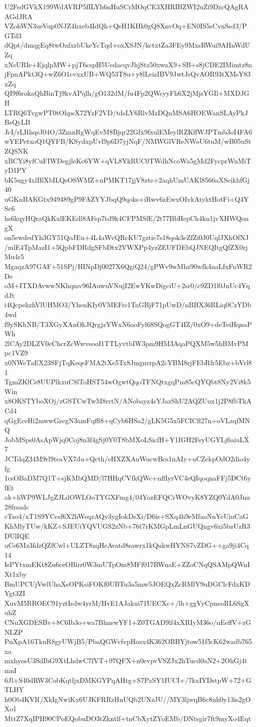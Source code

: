 U2FsdGVkX199WdAVRP5fILYh6nHuSCrMOqCE3XHRIBZWI2uZi9DzcQAgRAAGdJRA
VZohWN3ueVup0NJZ4hxeb4IdQh+QeH1KHk0gQ8XnvOq+EN0IS5sCvnSsd3/PGTd3
dQpt/dmqgEq8twOafxrbUkeYcTqd+oxXSJN/kctxtZa3FEy9MxsRWui9AHnWdUZq
xNsURIe+EjqlpMW+pjT6cspH5UedacqvJhjStz50xwaX9+SB+s8jCDE2IMimtz8n
jFpnAPkt3Q+wZ6O1cvxxUB+WQ53T8u+y8lLeizIBV9JwtJsQvAOR93tXMsY83xZq
QI9f6rokaQhBinTj9kvAPqlh/gO132dM/fu4Fp2QWsyyFh6X2jMjsYGIl+MXDJGH
LTRQ6TvgwPT0tOhpsX72YzF2VD/tdsLY6RlvMzDQnMSA6HOEWanSLAyPkJBsQyLB
JcI/rLRhqsJ04O/3ZmnRgWqEvM8Bjqr22Gfx9fxulEMeylRZKffWJPTmb3oI4FA6
wYEPetxoQ1QYFB/KSydxpUvl9p6D7yjNqF/NMWGlVReNWoU6tuM/wB05uStZQSNK
xBCYi8yfCuFIWDegjleKc6YW+qVL8YkRUC0TWdhNcoWa5gMd2FycprWuMiTyD1PY
bK5ugy4xlBlXbILQsOSWMZ+nPMKT17jjV8zte+2aqhUmUAKl8566aXSeikhfGj40
uGKnBAKGtx949489gP9FAZYYJbqQ9qoks+iRwv6zEwxOIvkAtyktHotFi+Q4YSc6
hs6kqyHQraQkKxlEKEdl8AFsp7td9k4CFPMSfE/2t77BbHepCh4kn1jvXHWQongX
on5ewdedYh3GY51QoJEu+4L4aWvQRcKU7gztie7s18qok3eZfZi0J0UqlJXhOfNJ
/mlE4TpMazI1+5QpbFDRdgSFbDtx2VWXPp4yzZEUFDEbQJNEQItgQfZX0rjMu4r5
MgaqzA97GAF+51SPj/HINpDj0027X6QgiQ24/gPWv9wMhz90wfk4naLfxFuWR2De
oM+ITXDAvwwNKhqmv96IAuwnVNujI2EwYKwDigciU+2sr0/c9ZD1l0JnUc4YqdJt
i4QcpekzhVlUHMO3/YhenKIy0VMEFrs1TaGBjF71pUwD/nBBX36RLiq0CzYDb4wd
f9ySKhNB/T3XGyXAnOkJQrgjzYWxN6aoFyl68SQogGT4IZ/0xO9+deTeiHqnaPWh
2lCAy2DLZV0eChcrZcWwvsooI1TTLyvtbIW3pm9HM3AqaPQXM5w5hBMvPMpc1VZ9
x0NWeTaEX23SFjTqKeqeFMA2tXe5Tx8JmgnrrpA2cYBM8rjFEbRfr5Ebz+bVrl81
TgmZKlCs8UUPlkxuC8lToHST54wOgwtQqoTFNQtxgqPm85cQYQbt8Ny2Vi8k5Win
x8OKSTYboXOj/zGSTCwTwM8rrtN/ANobayz4sYJazShU2AQZUux1j2P8fbTkACd4
qGgEceHi2mwwGzegN3amFqffl8+qCyb6HSa2/gLK5G5x5FCICfl27n+oVLzqfMNQ
JobMSps0AsApWjq0Coj8n3f4gSj0Y0T8bMXoLSicfH+Y1IGH2FsyUGYLj6aiuLX7
JCTdqZ34M9rl9teaVX7du+Qcth/eHXZXAuWucwBcs1nAIy+uCZekpOdO2dio4yfg
1csOBaDM7Q1T+sjKMbQMD/l7HHqCVfkQWc+nflIyrVC4eQIqoqnaFFj5DCt6yfEt
ak+hWP9WLJgZJLdOWLOoTYGXFmg4/04YozEFQCrWOvyK8YZQ0YdA0Jnu28frsadc
cTzo4/xT1S9YCcsf6X2hWeqzAQy3ygIokDsXi/D6is+SXq4h9eMfaoNnYcUiuCaG
KhMlyTUw/kKZ+SJEUiYQVUGS2zNb+76t7rKMGpLmLnGUQngv6xi5bzUzR3DUlIQE
uCe6Mz3fdzQZfCwl+ULZT8zqHeAvatd8sawrx1kQukwHYNS7vZDG++ga9ji4Cq14
IsPYtxmEKt8Zu6ceOBirr0W3mUTpOm8MFf017RWuaE+ZZoCNqQSAMpQWnIXt1xby
BmUPCUjVwlUhaXsOPKsiFOKf0UBTu3a5mw5JOEQxZcRMlY9uDGClcFdxKDYgt3ZI
XuvM5RROEC91yztIsdw4yrM/HvE1AJakui71UECXc+/lh+ggVyCpneoRL6SgXuhZ
CNuXGDESBv+8C6Ib3o+wa7BhnswYF1+Z0TGAD9lf4xXRIyM36o/uEeffV+zGNLZP
PnXpA16TkuR8gyUWjB5/PbaQGWvfvpHozx4K362OBBYjtow51f5cK62wadb765xa
mxhyosU3SdIbG9XtLhdwC7fVT+97QFX+n0evpvVSZJx2hTucd0aN2+2OhGj4tmnI
6Jl+S40dRW3CobKqtljxDMKGYPqAHtg+S7PaSY1IUCI+/7kxIYDstpW+72+GTLHY
h0Ob4KVR/XkIgNwiKx6UJKFRRzHnUQb2UNzJU//MY3ljwqB6c8nh0y13is2gOXo1
MttZ7XqIPH90CPoEQobuDO3tZkntlf+tnCbXytZYoEMb/DNtsgir7ft9myXo4Eqt
